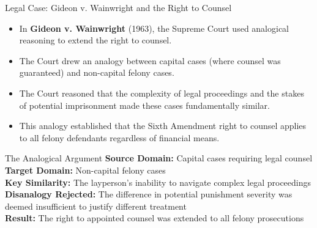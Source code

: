 \documentclass{beamer}
\begin{document}
\begin{frame}{Legal Case: Gideon v. Wainwright and the Right to Counsel}
	\begin{itemize}
		\item In \textbf{Gideon v. Wainwright} (1963), the Supreme Court used analogical reasoning to extend the right to counsel.
		\item The Court drew an analogy between capital cases (where counsel was guaranteed) and non-capital felony cases.
		\item The Court reasoned that the complexity of legal proceedings and the stakes of potential imprisonment made these cases fundamentally similar.
		\item This analogy established that the Sixth Amendment right to counsel applies to all felony defendants regardless of financial means.
	\end{itemize}
	
	\begin{exampleblock}{The Analogical Argument}
		\scriptsize
		\textbf{Source Domain:} Capital cases requiring legal counsel\\
		\textbf{Target Domain:} Non-capital felony cases\\
		\textbf{Key Similarity:} The layperson's inability to navigate complex legal proceedings\\
		\textbf{Disanalogy Rejected:} The difference in potential punishment severity was deemed insufficient to justify different treatment\\
		\textbf{Result:} The right to appointed counsel was extended to all felony prosecutions
	\end{exampleblock}
\end{frame}
\end{document}
